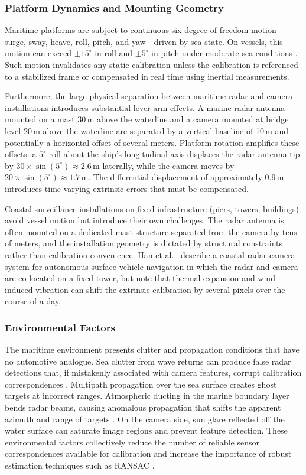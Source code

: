 \subsubsection{Platform Dynamics and Mounting Geometry}

Maritime platforms are subject to continuous six-degree-of-freedom motion---surge, sway, heave, roll, pitch, and yaw---driven by sea state. On vessels, this motion can exceed $\pm15^{\circ}$ in roll and $\pm5^{\circ}$ in pitch under moderate sea conditions \cite{Ward2006}. Such motion invalidates any static calibration unless the calibration is referenced to a stabilized frame or compensated in real time using inertial measurements.

Furthermore, the large physical separation between maritime radar and camera installations introduces substantial lever-arm effects. A marine radar antenna mounted on a mast 30\,m above the waterline and a camera mounted at bridge level 20\,m above the waterline are separated by a vertical baseline of 10\,m and potentially a horizontal offset of several meters. Platform rotation amplifies these offsets: a $5^{\circ}$ roll about the ship's longitudinal axis displaces the radar antenna tip by $30 \times \sin(5^{\circ}) \approx 2.6$\,m laterally, while the camera moves by $20 \times \sin(5^{\circ}) \approx 1.7$\,m. The differential displacement of approximately 0.9\,m introduces time-varying extrinsic errors that must be compensated.

Coastal surveillance installations on fixed infrastructure (piers, towers, buildings) avoid vessel motion but introduce their own challenges. The radar antenna is often mounted on a dedicated mast structure separated from the camera by tens of meters, and the installation geometry is dictated by structural constraints rather than calibration convenience. Han et al.\ \cite{han2020autonomous} describe a coastal radar-camera system for autonomous surface vehicle navigation in which the radar and camera are co-located on a fixed tower, but note that thermal expansion and wind-induced vibration can shift the extrinsic calibration by several pixels over the course of a day.

\subsubsection{Environmental Factors}

The maritime environment presents clutter and propagation conditions that have no automotive analogue. Sea clutter from wave returns can produce false radar detections that, if mistakenly associated with camera features, corrupt calibration correspondences \cite{Ward2006}. Multipath propagation over the sea surface creates ghost targets at incorrect ranges. Atmospheric ducting in the marine boundary layer bends radar beams, causing anomalous propagation that shifts the apparent azimuth and range of targets \cite{Skolnik2008}. On the camera side, sun glare reflected off the water surface can saturate image regions and prevent feature detection. These environmental factors collectively reduce the number of reliable sensor correspondences available for calibration and increase the importance of robust estimation techniques such as RANSAC \cite{fischler1981random}.

